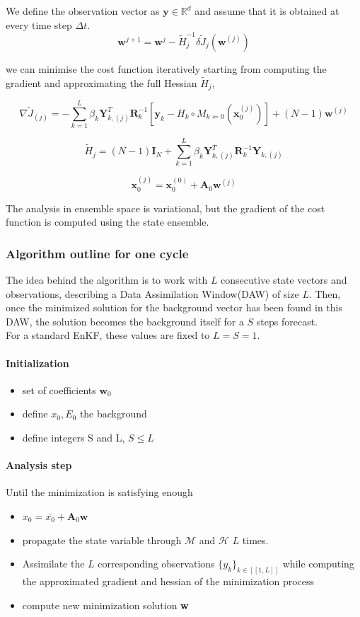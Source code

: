 \documentclass[a4,12pt]{article}
\numberwithin{equation}{section}
\begin{document}
We define the observation vector as $\textbf{y} \in \mathbb{R}^d$ and assume that it is obtained at every time step $\Delta t$. \\

$$\textbf{w}^{j+1} = \textbf{w}^{j} - \tilde{H}_{j}^{-1} \delta \tilde{J}_{j}(\textbf{w}^{(j)})$$

we can minimise the cost function iteratively starting from computing the gradient and approximating the full Hessian $\tilde{H}_{j}$,

$$\nabla \tilde{J}_{(j)} = -\sum_{k=1}^{L}\beta_{k}\textbf{Y}_{k,(j)}^{T}\textbf{R}_{k}^{-1}[\textbf{y}_{k} - H_{k}\circ M_{k\Leftarrow 0}(\textbf{x}_{0}^{(j)})] + (N-1)\textbf{w}^{(j)}$$

$$\tilde{H}_{j}=(N-1)\textbf{I}_{N}+\sum_{k=1}^{L} \beta_{k} \textbf{Y}_{k,(j)}^{T}\textbf{R}^{-1}_{k} \textbf{Y}_{k,(j)} $$

$$\textbf{x}_{0}^{(j)} = \textbf{x}_{0}^{(0)} + \textbf{A}_{0}\textbf{w}^{(j)}$$

The analysis in ensemble space is variational, but the gradient of the cost function is computed using the state ensemble.
\subsubsection{Algorithm outline for one cycle}
The idea behind the algorithm is to work with $L$ consecutive state vectors and observations, describing a Data Assimilation Window(DAW) of size $L$. Then, once the minimized solution for the background vector has been found in this DAW, the solution becomes the background itself for a $S$ steps forecast. \\
For a standard EnKF, these values are fixed to $L = S = 1$. \\

\paragraph{Initialization}
\begin{itemize}
\item set of coefficients $\textbf{w}_0$
\item define $x_0, E_0$ the background
\item define integers S and L, $S \le L$
\end{itemize}
\paragraph{Analysis step}
Until the minimization is satisfying enough
\begin{itemize}
\item $x_0 = \bar{x_0} + \textbf{A}_0 \textbf{w}$
\item propagate the state variable through $\mathcal{M}$ and $\mathcal{H}$ $L$ times.
\item Assimilate the $L$ corresponding observations $\{y_{k}\}_{k \in [\![1,L]\!] }$ while computing the approximated gradient and hessian of the minimization process
\item compute new minimization solution \textbf{w}
\end{itemize}
\end{document}
